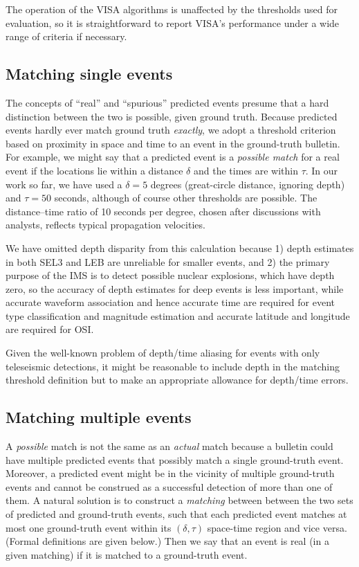 \documentclass[a4paper,12pt]{article}
\begin{document}
The operation of the VISA algorithms is unaffected by the thresholds
used for evaluation, so it is straightforward to report VISA's
performance under a wide range of criteria if necessary.

\subsection{Matching single events}

The concepts of ``real'' and ``spurious'' predicted events presume
that a hard distinction between the two is possible, given ground
truth.  Because predicted events hardly ever match ground truth {\em
  exactly}, we adopt a threshold criterion based on proximity in space
and time to an event in the ground-truth bulletin. For example, we
might say that a predicted event is a {\em possible match} for a real
event if the locations lie within a distance $\delta$ and the times
are within $\tau$. In our work so far, we have used a $\delta = 5$
degrees (great-circle distance, ignoring depth) and $\tau = 50$
seconds, although of course other thresholds are possible.
The distance--time ratio of 10 seconds per degree, chosen after
discussions with analysts, reflects typical propagation velocities.

We have omitted depth disparity from this calculation because 1) depth
estimates in both SEL3 and LEB are unreliable for smaller events, and 2) the
primary purpose of the IMS is to detect possible nuclear explosions,
which have depth zero, so the accuracy of depth estimates for deep
events is less important, while accurate waveform association and
hence accurate time are required for event type classification and
magnitude estimation and accurate latitude and
longitude are required for OSI.

Given the well-known problem of depth/time aliasing for events with
only teleseismic detections, it might be reasonable to include depth
in the matching threshold definition but to make an appropriate
allowance for depth/time errors.


\subsection{Matching multiple events}

A {\em possible} match is not the same as an {\em actual} match
because a bulletin could have multiple predicted events that
possibly match a single ground-truth event. Moreover, a predicted event might be in the vicinity of multiple
ground-truth events and cannot be construed as a successful detection
of more than one of them. A natural solution is to construct a {\em
  matching} between between the two sets of predicted and ground-truth
events, such that each predicted event matches at most one
ground-truth event within its $(\delta,\tau)$ space-time region and vice versa. (Formal definitions are given
below.) Then we say that an event is real (in a given matching) if it
is matched to a ground-truth event.
\end{document}
